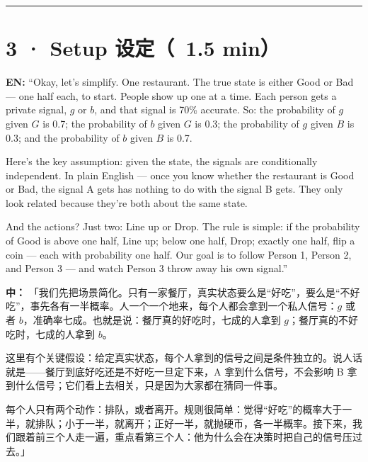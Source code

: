 \documentclass[11pt]{article}
\begin{document}
\vspace{0.35em}\noindent\rule{\textwidth}{0.3pt}\par

\section*{3 · Setup 设定（~1.5 min）}

\textbf{EN:} “Okay, let's simplify. One restaurant. The true state is either Good or Bad — one half each, to start. People show up one at a time. Each person gets a private signal, \(g\) or \(b\), and that signal is 70\% accurate. So: the probability of \(g\) given \(G\) is 0.7; the probability of \(b\) given \(G\) is 0.3; the probability of \(g\) given \(B\) is 0.3; and the probability of \(b\) given \(B\) is 0.7.\par

Here's the key assumption: given the state, the signals are conditionally independent. In plain English — once you know whether the restaurant is Good or Bad, the signal A gets has nothing to do with the signal B gets. They only look related because they're both about the same state.\par

And the actions? Just two: Line up or Drop. The rule is simple: if the probability of Good is above one half, Line up; below one half, Drop; exactly one half, flip a coin — each with probability one half. Our goal is to follow Person 1, Person 2, and Person 3 — and watch Person 3 throw away his own signal.”\par

\textbf{中：} 「我们先把场景简化。只有一家餐厅，真实状态要么是“好吃”，要么是“不好吃”，事先各有一半概率。人一个一个地来，每个人都会拿到一个私人信号：\(g\) 或者 \(b\)，准确率七成。也就是说：餐厅真的好吃时，七成的人拿到 \(g\)；餐厅真的不好吃时，七成的人拿到 \(b\)。\par

这里有个关键假设：给定真实状态，每个人拿到的信号之间是条件独立的。说人话就是——餐厅到底好吃还是不好吃一旦定下来，A 拿到什么信号，不会影响 B 拿到什么信号；它们看上去相关，只是因为大家都在猜同一件事。\par

每个人只有两个动作：排队，或者离开。规则很简单：觉得“好吃”的概率大于一半，就排队；小于一半，就离开；正好一半，就抛硬币，各一半概率。接下来，我们跟着前三个人走一遍，重点看第三个人：他为什么会在决策时把自己的信号压过去。」\par
\end{document}

